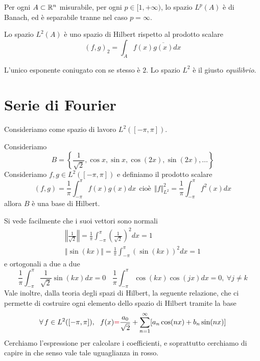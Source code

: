 \begin{thm}
Per ogni $A\subset \mathbb{R}^{n}$ misurabile, per ogni $p\in [1, + \infty)$, lo spazio $L^{p}(A)$ è di Banach, ed è separabile tranne nel caso $p = \infty $.
\end{thm}
\begin{thm}
Lo spazio $L^{2}(A)$ è uno spazio di Hilbert rispetto al prodotto scalare
\begin{equation*}
(f, g)_{2} = \int_{A} f(x)\overline{g(x)} dx
\end{equation*}
\end{thm}
\begin{rem}
L'unico esponente coniugato con se stesso è $2$. Lo spazio $L^{2}$ è il giusto \textit{equilibrio}.
\end{rem}

\section{Serie di Fourier}

Consideriamo come spazio di lavoro $L^{2}([- \pi, \pi])$.
\begin{thm}
Consideriamo
\begin{equation*}
B = \left\{\frac{1}{\sqrt{2}}, \cos x, \sin x, \cos(2x), \sin(2x), \dotsc \right\}
\end{equation*}
Consideriamo $f, g\in L^{2}([- \pi, \pi])$ e definiamo il prodotto scalare
\begin{equation*}
\boxed{(f, g) = \frac{1}{\pi}\int^{\pi}_{- \pi} f(x) g(x) dx} \ \ \text{cioè} \ \ \Vert f \Vert^{2}_{L^{2}} = \frac{1}{\pi}\int^{\pi}_{- \pi} f^{2}(x) dx
\end{equation*}
allora $B$ è una base di Hilbert.
\end{thm}
Si vede facilmente che i suoi vettori sono normali
\begin{gather*}
\left \Vert \frac{1}{\sqrt{2}}\right \Vert = \frac{1}{\pi}\int^{\pi}_{- \pi}\left(\frac{1}{\sqrt{2}}\right)^{2} dx = 1\\
\Vert \sin(kx) \Vert = \frac{1}{\pi}\int^{\pi}_{- \pi}(\sin(kx))^{2} dx = 1
\end{gather*}
e ortogonali a due a due
\begin{equation*}
\frac{1}{\pi}\int^{\pi}_{- \pi}\frac{1}{\sqrt{2}}\sin(kx) dx = 0\ \ \ \ \frac{1}{\pi}\int^{\pi}_{- \pi}\cos(kx)\cos(jx) dx = 0, \ \forall j\neq k
\end{equation*}
Vale inoltre, dalla teoria degli spazi di Hilbert, la seguente relazione, che ci permette di costruire ogni elemento dello spazio di Hilbert tramite la base
\begin{equation*}
\forall f\in L^{2}([- \pi, \pi]), \ \ f(x)\textcolor[rgb]{0.82, 0.01, 0.11}{=}\frac{a_{0}}{\sqrt{2}} + \sum\limits^{\infty}_{n = 1}[a_{n}\cos(nx) + b_{n}\sin(nx)]
\end{equation*}
Cerchiamo l'espressione per calcolare i coefficienti, e soprattutto cerchiamo di capire in che senso vale tale uguaglianza in rosso.


